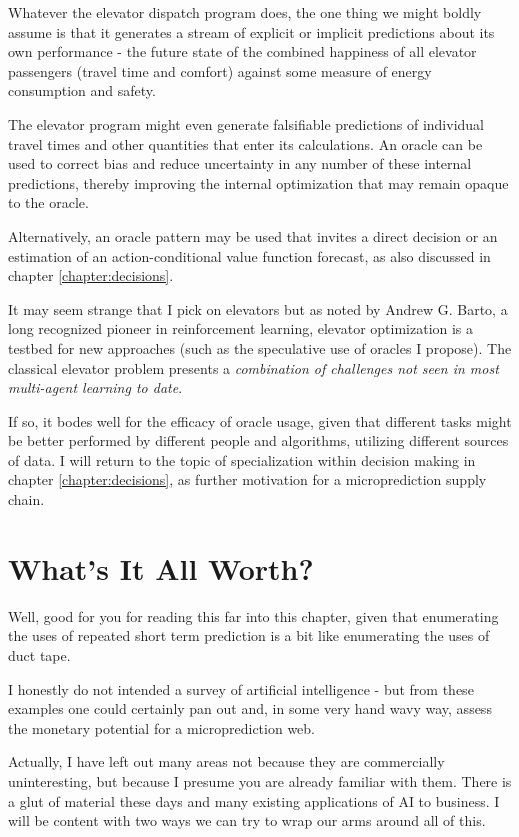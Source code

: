 Whatever the elevator dispatch program does, the one thing we might boldly assume is that it generates a stream of explicit or implicit predictions about its own performance - the future state of the combined happiness of all elevator passengers (travel time and comfort) against some measure of energy consumption and safety. 

The elevator program might even generate falsifiable predictions of individual travel times and other quantities that enter its calculations. An oracle can be used to correct bias and reduce uncertainty in any number of these internal predictions, thereby improving the internal optimization that may remain opaque to the oracle. 

Alternatively, an oracle pattern may be used that invites a direct decision or an estimation of an action-conditional value function forecast, as also discussed in chapter \ref{chapter:decisions}. 

It may seem strange that I pick on elevators but as noted by Andrew G. Barto, a long recognized pioneer in reinforcement learning, elevator optimization is a testbed for new approaches (such as the speculative use of oracles I propose). The classical elevator problem presents a {\em combination of challenges not seen in most multi-agent learning to date}.\cite{Barto1996ImprovingLearning}

If so, it bodes well for the efficacy of oracle usage, given that different tasks might be better performed by different people and algorithms, utilizing different sources of data. I will return to the topic of specialization within decision making in chapter \ref{chapter:decisions}, as further motivation for a microprediction supply chain. 


\section{What's It All Worth?}
\label{sec:mckinsey}

Well, good for you for reading this far into this chapter, given that enumerating the uses of repeated short term prediction is a bit like enumerating the uses of duct tape. 

I honestly do not intended a survey of artificial intelligence - but from these examples one could certainly pan out and, in some very hand wavy way, assess the monetary potential for a microprediction web. 

Actually, I have left out many areas not because they are commercially uninteresting, but because I presume you are already familiar with them. There is a glut of material these days and many existing applications of AI to business. I will be content with two ways we can try to wrap our arms around all of this.   

